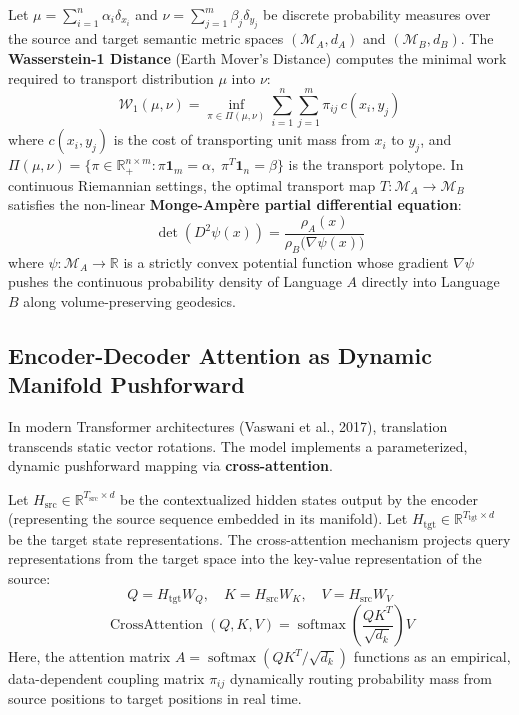\documentclass[11pt,letterpaper]{article}
\begin{document}
Let $\mu = \sum_{i=1}^{n} \alpha_i \delta_{x_i}$ and $\nu = \sum_{j=1}^{m} \beta_j \delta_{y_j}$ be discrete probability measures over the source and target semantic metric spaces $(\mathcal{M}_A, d_A)$ and $(\mathcal{M}_B, d_B)$. The \textbf{Wasserstein-1 Distance} (Earth Mover's Distance) computes the minimal work required to transport distribution $\mu$ into $\nu$:
\begin{equation}
\mathcal{W}_1(\mu, \nu) = \inf_{\pi \in \Pi(\mu, \nu)} \sum_{i=1}^n \sum_{j=1}^m \pi_{ij} \, c(x_i, y_j)
\end{equation}
where $c(x_i, y_j)$ is the cost of transporting unit mass from $x_i$ to $y_j$, and $\Pi(\mu, \nu) = \{\pi \in \mathbb{R}_+^{n \times m} : \pi \mathbf{1}_m = \alpha, \; \pi^T \mathbf{1}_n = \beta\}$ is the transport polytope. In continuous Riemannian settings, the optimal transport map $T: \mathcal{M}_A \to \mathcal{M}_B$ satisfies the non-linear \textbf{Monge-Ampère partial differential equation}:
\begin{equation}
\det\left(D^2 \psi(x)\right) = \frac{\rho_A(x)}{\rho_B\big(\nabla \psi(x)\big)}
\end{equation}
where $\psi: \mathcal{M}_A \to \mathbb{R}$ is a strictly convex potential function whose gradient $\nabla \psi$ pushes the continuous probability density of Language $A$ directly into Language $B$ along volume-preserving geodesics.

\subsection{Encoder-Decoder Attention as Dynamic Manifold Pushforward}
In modern Transformer architectures (Vaswani et al., 2017), translation transcends static vector rotations. The model implements a parameterized, dynamic pushforward mapping via \textbf{cross-attention}.

Let $H_{\text{src}} \in \mathbb{R}^{T_{\text{src}} \times d}$ be the contextualized hidden states output by the encoder (representing the source sequence embedded in its manifold). Let $H_{\text{tgt}} \in \mathbb{R}^{T_{\text{tgt}} \times d}$ be the target state representations. The cross-attention mechanism projects query representations from the target space into the key-value representation of the source:
\begin{equation}
Q = H_{\text{tgt}} W_Q, \quad K = H_{\text{src}} W_K, \quad V = H_{\text{src}} W_V
\end{equation}
\begin{equation}
\operatorname{CrossAttention}(Q, K, V) = \operatorname{softmax}\left(\frac{Q K^T}{\sqrt{d_k}}\right) V
\end{equation}
Here, the attention matrix $A = \operatorname{softmax}(Q K^T / \sqrt{d_k})$ functions as an empirical, data-dependent coupling matrix $\pi_{ij}$ dynamically routing probability mass from source positions to target positions in real time.
\end{document}
